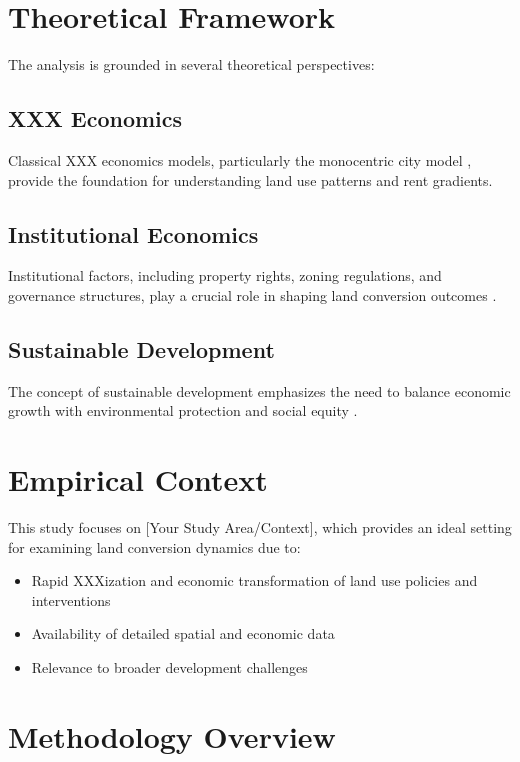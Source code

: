 \section{Theoretical Framework}

The analysis is grounded in several theoretical perspectives:

\subsection{XXX Economics}
Classical XXX economics models, particularly the monocentric city model \citep{alonso1964_location, mills1967_XXX}, provide the foundation for understanding land use patterns and rent gradients.

\subsection{Institutional Economics}
Institutional factors, including property rights, zoning regulations, and governance structures, play a crucial role in shaping land conversion outcomes \citep{north1990_institutions, williamson2000_institutions}.

\subsection{Sustainable Development}
The concept of sustainable development emphasizes the need to balance economic growth with environmental protection and social equity \citep{world1987_our_common_future}.

\section{Empirical Context}

This study focuses on [Your Study Area/Context], which provides an ideal setting for examining land conversion dynamics due to:

\begin{itemize}
    \item Rapid XXXization and economic transformation
    \variety of land use policies and interventions
    \item Availability of detailed spatial and economic data
    \item Relevance to broader development challenges
\end{itemize}

\section{Methodology Overview}

